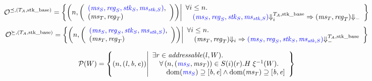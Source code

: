 \documentclass[a4paper]{article}
\begin{document}
\[
  \lrol = \left\{ \npair{\left(\array{l}\src{(\ms_S,\reg_S,\stk_S,\ms_{\stk,S})},\\(\ms_T,\reg_T)\endarray\right)} \middle|
    \begin{array}{l}
      \forall i \leq n \ldotp \\
      \quad \src{(\ms_S,\reg_S,\stk_S,\ms_{\stk,S})} \sterm[i]{\ta,\stkb} \Rightarrow (\ms_T,\reg_T) \term\\
    \end{array}
\right\}
\]
\[
  \lror = \left\{ \npair{\left(\array{l}\src{(\ms_S,\reg_S,\stk_S,\ms_{\stk,S})},\\(\ms_T,\reg_T)\endarray\right)} \middle|
    \begin{array}{l}
      \forall i \leq n \ldotp \\ 
      \quad (\ms_T ,\reg_T) \term[i] \Rightarrow \src{(\ms_S,\reg_S,\stk_S,\ms_{\stk,S})} \sterm{\ta,\stkb}
    \end{array}
\right\}
\]


\[
  \lrp(W) = \left\{ \npair{(\lin,\baddr,\eaddr)} \middle|
    \begin{array}{l}
      \exists r \in \addressable{l,W} \ldotp\\
      \quad \forall \npair{\stpair{\ms}{\ms}} \in S(i)(r).H \; \xi^{-1}(W)  \ldotp \\
      \qquad \dom(\src{\ms_S}) \supseteq [\baddr,\eaddr] \wedge \dom(\ms_T) \supseteq [\baddr,\eaddr]
    \end{array}
  \right\}
\]
\end{document}
